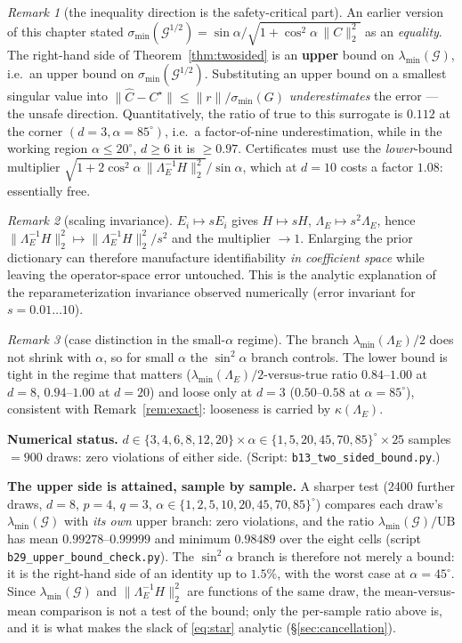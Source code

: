 \documentclass[11pt]{article}
\theoremstyle{remark}
\newtheorem{remark}{Remark}[section]
\newcommand{\Gr}{\mathcal{G}}
\newcommand{\Le}{\Lambda_E}
\newcommand{\Cnorm}{\bigl\|\Le^{-1}H\bigr\|_2^2}
\newcommand{\minr}[1]{\sigma_{\min}(#1)}
\begin{document}
\begin{remark}[the inequality direction is the safety-critical part]
\label{rem:direction}
An earlier version of this chapter stated
$\minr{\Gr^{1/2}}=\sin\alpha/\sqrt{1+\cos^2\alpha\,\|C\|_2^2}$ as an \emph{equality}.
The right-hand side of Theorem~\ref{thm:twosided} is an \textbf{upper} bound on
$\lambda_{\min}(\Gr)$, i.e.\ an upper bound on $\minr{\Gr^{1/2}}$. Substituting an upper
bound on a smallest singular value into
$\|\hat C-C^\star\|\le\|r\|/\minr G$ \emph{underestimates} the error --- the unsafe
direction. Quantitatively, the ratio of true to this surrogate is $0.112$ at the corner
$(d=3,\alpha=85^\circ)$, i.e.\ a factor-of-nine underestimation, while in the working
region $\alpha\le20^\circ$, $d\ge6$ it is $\ge0.97$. Certificates must use the
\emph{lower}-bound multiplier
$\sqrt{1+2\cos^2\alpha\,\Cnorm}/\sin\alpha$, which at $d=10$ costs a factor $1.08$:
essentially free.
\end{remark}

\begin{remark}[scaling invariance]
$E_i\mapsto sE_i$ gives $H\mapsto sH$, $\Le\mapsto s^2\Le$, hence
$\Cnorm\mapsto\Cnorm/s^2$ and the multiplier $\to1$. Enlarging the prior dictionary can
therefore manufacture identifiability \emph{in coefficient space} while leaving the
operator-space error untouched. This is the analytic explanation of the
reparameterization invariance observed numerically (error invariant for
$s=0.01\ldots10$).
\end{remark}

\begin{remark}[case distinction in the small-$\alpha$ regime]
The branch $\lambda_{\min}(\Le)/2$ does not shrink with $\alpha$, so for small $\alpha$
the $\sin^2\alpha$ branch controls. The lower bound is tight in the regime that matters
($\lambda_{\min}(\Le)/2$-versus-true ratio $0.84$--$1.00$ at $d=8$, $0.94$--$1.00$ at
$d=20$) and loose only at $d=3$ ($0.50$--$0.58$ at $\alpha=85^\circ$), consistent with
Remark~\ref{rem:exact}: looseness is carried by $\kappa(\Le)$.
\end{remark}

\noindent\textbf{Numerical status.} $d\in\{3,4,6,8,12,20\}\times
\alpha\in\{1,5,20,45,70,85\}^\circ\times25$ samples $=900$ draws: zero violations of
either side. (Script: \texttt{b13\_two\_sided\_bound.py}.)

\noindent\textbf{The upper side is attained, sample by sample.} A sharper test
(2400 further draws, $d=8$, $p=4$, $q=3$, $\alpha\in\{1,2,5,10,20,45,70,85\}^\circ$)
compares each draw's $\lambda_{\min}(\Gr)$ with \emph{its own} upper branch:
zero violations, and the ratio $\lambda_{\min}(\Gr)/\mathrm{UB}$ has mean
$0.99278$--$0.99999$ and minimum $0.98489$ over the eight cells
(script \texttt{b29\_upper\_bound\_check.py}). The $\sin^2\alpha$ branch is therefore
not merely a bound: it is the right-hand side of an identity up to $1.5\%$, with the
worst case at $\alpha=45^\circ$. Since $\lambda_{\min}(\Gr)$ and $\|\Le^{-1}H\|_2^2$ are
functions of the same draw, the mean-versus-mean comparison is not a test of the bound;
only the per-sample ratio above is, and it is what makes the slack of
\eqref{eq:star} analytic (\S\ref{sec:cancellation}).
\end{document}

